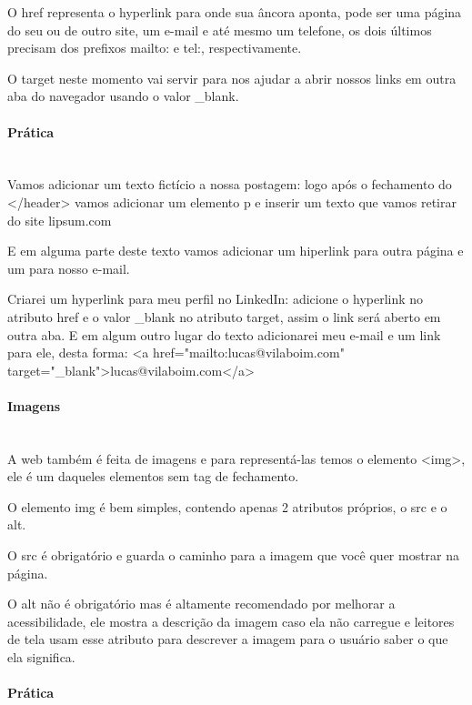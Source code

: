 \documentclass[12pt,a4paper]{article}
\begin{document}
	O href representa o hyperlink para onde sua âncora aponta, pode ser uma página do seu ou de outro site, um e-mail e até mesmo um telefone, os dois últimos precisam dos prefixos mailto: e tel:, respectivamente.
	
	O target neste momento vai servir para nos ajudar a abrir nossos links em outra aba do navegador usando o valor \_blank.
	
	\paragraph{Prática} \mbox{} \\
	
	Vamos adicionar um texto fictício a nossa postagem: logo após o fechamento do </header> vamos adicionar um elemento p e inserir um texto que vamos retirar do site lipsum.com
	
	E em alguma parte deste texto vamos adicionar um hiperlink para outra página e um para nosso e-mail.
	
	Criarei um hyperlink para meu perfil no LinkedIn: adicione o hyperlink no atributo href e o valor \_blank no atributo target, assim o link será aberto em outra aba. E em algum outro lugar do texto adicionarei meu e-mail e um link para ele, desta forma: <a href="mailto:lucas@vilaboim.com" target="\_blank">lucas@vilaboim.com</a>
	
	\paragraph{Imagens} \mbox{} \\
	
	A web também é feita de imagens e para representá-las temos o elemento <img>, ele é um daqueles elementos sem tag de fechamento.
	
	O elemento img é bem simples, contendo apenas 2 atributos próprios, o src e o alt.
	
	O src é obrigatório e guarda o caminho para a imagem que você quer mostrar na página.
	
	O alt não é obrigatório mas é altamente recomendado por melhorar a acessibilidade, ele mostra a descrição da imagem caso ela não carregue e leitores de tela usam esse atributo para descrever a imagem para o usuário saber o que ela significa.
	
	\paragraph{Prática} \mbox{} \\
	
\end{document}
